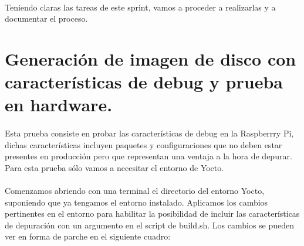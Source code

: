\paragraph{}Teniendo claras las tareas de este sprint, vamos a proceder a realizarlas
y a documentar el proceso.

\section{Generación de imagen de disco con características de debug y prueba en hardware.}

\paragraph{}Esta prueba consiste en probar las características de debug en la
Raspberrry Pi, dichas características incluyen paquetes y configuraciones que no deben
estar presentes en producción pero que representan una ventaja a la hora de depurar.
Para esta prueba sólo vamos a necesitar el entorno de Yocto.

\paragraph{}Comenzamos abriendo con una terminal el directorio del entorno Yocto,
suponiendo que ya tengamos el entorno instalado. Aplicamos los cambios pertinentes
en el entorno para habilitar la posibilidad de incluir las características de depuración
con un argumento en el script de build.sh. Los cambios se pueden ver en forma de parche
en el siguiente cuadro:

